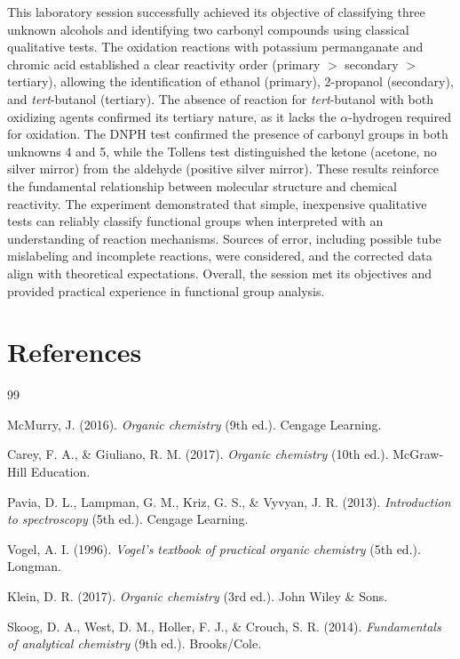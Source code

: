 \documentclass[12pt, a4paper]{article}
\begin{document}
This laboratory session successfully achieved its objective of classifying three unknown alcohols and identifying two carbonyl compounds using classical qualitative tests. The oxidation reactions with potassium permanganate and chromic acid established a clear reactivity order (primary $>$ secondary $>$ tertiary), allowing the identification of ethanol (primary), 2-propanol (secondary), and \textit{tert}-butanol (tertiary). The absence of reaction for \textit{tert}-butanol with both oxidizing agents confirmed its tertiary nature, as it lacks the $\alpha$-hydrogen required for oxidation. The DNPH test confirmed the presence of carbonyl groups in both unknowns 4 and 5, while the Tollens test distinguished the ketone (acetone, no silver mirror) from the aldehyde (positive silver mirror). These results reinforce the fundamental relationship between molecular structure and chemical reactivity. The experiment demonstrated that simple, inexpensive qualitative tests can reliably classify functional groups when interpreted with an understanding of reaction mechanisms. Sources of error, including possible tube mislabeling and incomplete reactions, were considered, and the corrected data align with theoretical expectations. Overall, the session met its objectives and provided practical experience in functional group analysis.

\section{References}

\begin{thebibliography}{99}

McMurry, J. (2016). \textit{Organic chemistry} (9th ed.). Cengage Learning.

Carey, F. A., \& Giuliano, R. M. (2017). \textit{Organic chemistry} (10th ed.). McGraw-Hill Education.

Pavia, D. L., Lampman, G. M., Kriz, G. S., \& Vyvyan, J. R. (2013). \textit{Introduction to spectroscopy} (5th ed.). Cengage Learning.

Vogel, A. I. (1996). \textit{Vogel's textbook of practical organic chemistry} (5th ed.). Longman.

Klein, D. R. (2017). \textit{Organic chemistry} (3rd ed.). John Wiley \& Sons.

Skoog, D. A., West, D. M., Holler, F. J., \& Crouch, S. R. (2014). \textit{Fundamentals of analytical chemistry} (9th ed.). Brooks/Cole.

\end{thebibliography}
\end{document}

